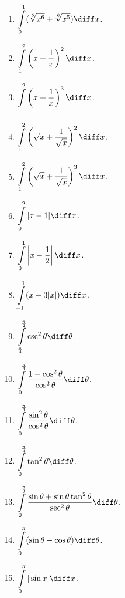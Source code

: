 \begin{multicols}{3}
\begin{enumerate}
\answer{$\left[ \right]_{}^{}=$}
\item $\displaystyle \int\limits_0^{1} (\sqrt[5]{x^6}+\sqrt[6]{x^5})\diff x $.

\answer{$\left[ \right]_{}^{}=$}
\item $\displaystyle \int\limits_{1}^{2} \left(x +\frac{1}{x} \right)^2 \diff x$.

\answer{$\left[ \right]_{}^{}=$}
\item $\displaystyle \int\limits_{1}^{2} \left(x +\frac{1}{x} \right)^3 \diff x$.

\answer{$\left[ \right]_{}^{}=$}
\item $\displaystyle \int\limits_{1}^{2} \left(\sqrt{x} +\frac{1}{\sqrt{x}} \right)^2 \diff x$.

\answer{$\left[ \right]_{}^{}=$}
\item $\displaystyle \int\limits_{1}^{2} \left(\sqrt{x} +\frac{1}{\sqrt{x}} \right)^3 \diff x$.

\answer{$\left[ \right]_{}^{}=$}
\item $\displaystyle \int\limits_{0}^{2}|x-1| \diff x$.

\answer{$\left[ \right]_{}^{}=$}
\item $\displaystyle \int\limits_{0}^{1} \left|x-\frac{1}{2}\right| \diff x$.

\answer{$\left[ \right]_{}^{}=$}
\item $\displaystyle \int\limits_{-1}^{1}(x-3|x|) \diff x$.

\answer{$\left[ \right]_{}^{}=$}
\item $\displaystyle \int\limits_{\frac{\pi}{4}}^{\frac{\pi}{2}} \csc^2\theta \diff \theta$.

\answer{$\left[ \right]_{}^{}=$}
\item $\displaystyle \int\limits_{0}^{\frac{\pi}{4}}\frac{1-\cos^2\theta}{\cos^2\theta} \diff \theta$.

\answer{$\left[ \right]_{}^{}=$}
\item $\displaystyle \int\limits_{0}^{\frac{\pi}{4}}\frac{\sin^2\theta}{\cos^2\theta} \diff \theta$.

\answer{$\left[ \right]_{}^{}=$}
\item $\displaystyle \int\limits_{0}^{\frac{\pi}{4}}\tan^2\theta \diff \theta$.

\answer{$\left[ \right]_{}^{}=$}
\item $\displaystyle \int\limits_{0}^{\frac{\pi}{3}} \frac{\sin \theta +\sin \theta \tan^2\theta}{\sec^2\theta}\diff \theta$.

\answer{$\left[ \right]_{}^{}=$}
\item $\displaystyle \int\limits_{0}^{\pi} (\sin \theta -\cos \theta) \diff \theta$.

\answer{$\left[ \right]_{}^{}=$}
\item $\displaystyle \int\limits_{0}^{\pi}|\sin x| \diff x$.
\end{enumerate}
\end{multicols}
